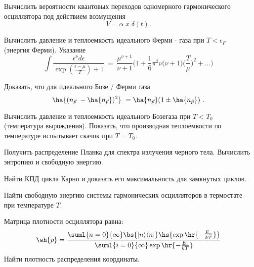 \documentclass[a4paper,draft]{article}
\begin{document}
\begin{nums}{-2}
\item
 Вычислить вероятности квантовых переходов одномерного
гармонического осциллятора под действием возмущения
$$V=\alpha \;x\;\delta(t). $$
\item Вычислить давление и теплоемкость идеального Ферми - газа
при $T < \epsilon_F$ (энергия Ферми). \vskip5pt Указание
$$ \int \frac{\epsilon^{\nu} d\epsilon}{\exp
(\frac{\epsilon - \mu}{T} ) + 1} \ =\ \frac{\mu^{\nu +1}}{\nu + 1}
\biggl( 1+ \frac{1}{6} \pi^2 \nu \biggl( \nu + 1\biggr)
\biggl(\frac{T}{\mu}\biggr)^2 + \ldots \biggr)
$$

\item Доказать, что для идеального Бозе / Ферми газа
$$\ha{(n_{\vec p } \ - \ha{ n_{\vec p} } )^2 } \ = \ha{ n_{\vec p} } (1 \pm \ha{ n_{\vec p} })\ . $$
\item Вычислить давление и теплоемкость идеального Бозе\д газа при
$T < T_0$ (температура вырождения). Показать, что производная
теплоемкости по температуре испытывает скачок при $T=T_0$.   \item
Получить распределение Планка для спектра излучения черного тела.
Вычислить энтропию и свободную энергию. \item Найти КПД цикла
Карно и доказать его максимальность для замкнутых циклов. \item
Найти свободную энергию системы гармонических осцилляторов в
термостате при температуре $T$. \item Матрица плотности
осциллятора равна:
$$
\wh{\rho} = \frac{\suml{n=0}{\infty} \bs{|n\rangle\langle n|}
\hs{\exp\hr{ -\frac{E_n}{kT}}}}
{\suml{i=0}{\infty} \exp\hr{-\frac{E_i}{kT}}}$$
Найти плотность распределения координаты.
\end{nums}



\medskip\dmvntrail
\end{document}
